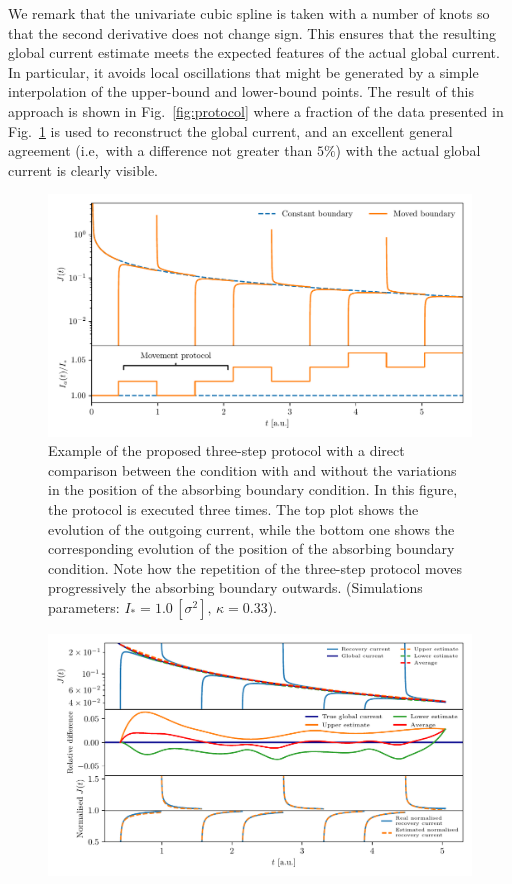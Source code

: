 {We remark that the univariate cubic spline is taken with a number of knots so that the second derivative does not change sign. This ensures that the resulting global current estimate meets the expected features of the actual global current. In particular, it avoids local oscillations that might be generated by a simple interpolation of the upper-bound and lower-bound points. The result of this approach is shown in Fig.~\ref{fig:protocol} where a fraction of the data presented in Fig.~\ref{fig:9} is used to reconstruct the global current, and an excellent general agreement (i.e,\ with a difference not greater than $5\%$) with the actual global current is clearly visible.
%
\begin{figure}[htp]
    \centering
    \includegraphics[width=\textwidth]{4_probing_the_diffusive_behavior/figs/final/the_protocol.pdf}
    \caption{Example of the proposed three-step protocol with a direct comparison between the condition with and without the variations in the position of the absorbing boundary condition. In this figure, the protocol is executed three times. The top plot shows the evolution of the outgoing current, while the bottom one shows the corresponding evolution of the position of the absorbing boundary condition. Note how the repetition of the three-step protocol moves progressively the absorbing boundary outwards. (Simulations parameters: $I_\ast = 1.0\,[\sigma^2],\,\kappa = 0.33$).}
    \label{fig:9}
\end{figure}
%
\begin{figure}[htp]
    \centering    
    \includegraphics[width=\textwidth]{4_probing_the_diffusive_behavior/figs/final/the_interpolation.pdf}

\end{figure}}
